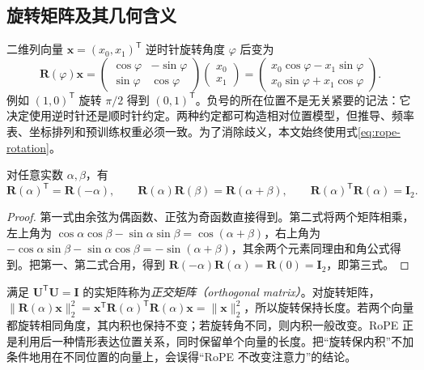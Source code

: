 \documentclass[UTF8,12pt,a4paper,fontset=fandol]{ctexart}
\begin{document}
\subsection{旋转矩阵及其几何含义}
二维列向量 $\mathbf x=(x_0,x_1)^{\mathsf T}$ 逆时针旋转角度 $\varphi$ 后变为
\begin{equation}
\mathbf R(\varphi)\mathbf x=
\begin{pmatrix}\cos\varphi&-\sin\varphi\\
\sin\varphi&\cos\varphi\end{pmatrix}
\begin{pmatrix}x_0\\x_1\end{pmatrix}
=\begin{pmatrix}x_0\cos\varphi-x_1\sin\varphi\\
x_0\sin\varphi+x_1\cos\varphi\end{pmatrix}.
\label{eq:rope-rotation}
\end{equation}
例如 $(1,0)^{\mathsf T}$ 旋转 $\pi/2$ 得到 $(0,1)^{\mathsf T}$。负号的所在位置不是无关紧要的记法：它决定使用逆时针还是顺时针约定。两种约定都可构造相对位置模型，但推导、频率表、坐标排列和预训练权重必须一致。为了消除歧义，本文始终使用式\eqref{eq:rope-rotation}。

\begin{proposition}[旋转的三个恒等式]
对任意实数 $\alpha,\beta$，有
\begin{equation}
\mathbf R(\alpha)^{\mathsf T}=\mathbf R(-\alpha),\qquad
\mathbf R(\alpha)\mathbf R(\beta)=\mathbf R(\alpha+\beta),\qquad
\mathbf R(\alpha)^{\mathsf T}\mathbf R(\alpha)=\mathbf I_2.
\label{eq:rope-group}
\end{equation}
\end{proposition}
\begin{proof}
第一式由余弦为偶函数、正弦为奇函数直接得到。第二式将两个矩阵相乘，左上角为 $\cos\alpha\cos\beta-\sin\alpha\sin\beta=\cos(\alpha+\beta)$，右上角为 $-\cos\alpha\sin\beta-\sin\alpha\cos\beta=-\sin(\alpha+\beta)$，其余两个元素同理由和角公式得到。把第一、第二式合用，得到 $\mathbf R(-\alpha)\mathbf R(\alpha)=\mathbf R(0)=\mathbf I_2$，即第三式。
\end{proof}

满足 $\mathbf U^{\mathsf T}\mathbf U=\mathbf I$ 的实矩阵称为\emph{正交矩阵（orthogonal matrix）}。对旋转矩阵，$\|\mathbf R(\alpha)\mathbf x\|_2^2=\mathbf x^{\mathsf T}\mathbf R(\alpha)^{\mathsf T}\mathbf R(\alpha)\mathbf x=\|\mathbf x\|_2^2$，所以旋转保持长度。若两个向量都旋转相同角度，其内积也保持不变；若旋转角不同，则内积一般改变。RoPE 正是利用后一种情形表达位置关系，同时保留单个向量的长度。把“旋转保内积”不加条件地用在不同位置的向量上，会误得“RoPE 不改变注意力”的结论。
\end{document}
